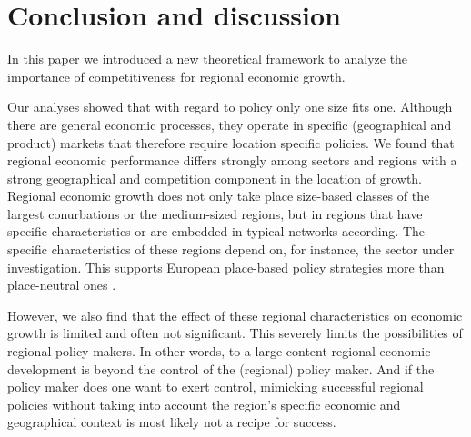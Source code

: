 \documentclass[11pt,parskip,abstracton,notitlepage, paper=a4]{scrartcl}
\begin{document}
\section{Conclusion and discussion}

In this paper we introduced a new theoretical framework to analyze the importance of competitiveness for regional economic growth. 

Our analyses showed that with regard to policy only one size fits one. Although there are general economic processes, they operate in specific (geographical and product) markets that therefore require location specific policies. We found that regional economic performance differs strongly among sectors and regions with a strong geographical and competition component in the location of growth. Regional economic growth does not only take place size-based classes of the largest conurbations or the medium-sized regions, but in regions that have specific characteristics or are embedded in typical networks according. The specific characteristics of these regions depend on, for instance, the sector under investigation. This supports European place-based policy strategies \citep{barca2009agenda,barca2012case} more than place-neutral ones \citep{worldbank2009}.

However, we also find that the effect of these regional characteristics on economic growth is limited and often not significant. This severely limits the possibilities of regional policy makers. In other words, to a large content regional economic development is beyond the control of the (regional) policy maker. And if the policy maker does one want to exert control, mimicking successful regional policies without taking into account the region's specific economic and geographical context is most likely not a recipe for success.

\begin{spacing}{1.2}
	\printbibliography
\end{spacing}
\end{document}
